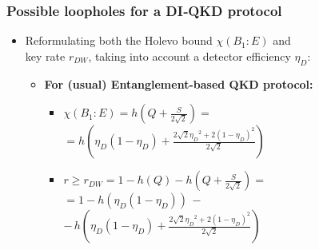 \documentclass{beamer}
\begin{document}
		\begin{frame}
			\frametitle{\Large Possible loopholes for a DI‑QKD protocol}

            \vspace{3.5ex}
            \begin{itemize}
                \item Reformulating both the Holevo bound $\chi({B}_{1}:E)$ and\\ key rate ${r}_{DW}$, taking into account a detector efficiency ${\eta}_{D}$:
                \begin{itemize}
                    \item \textbf{For (usual) Entanglement-based QKD protocol:}
                    \begin{itemize}
                        \item $\chi({B}_{1}:E) = h\left( Q + \frac{S}{2 \sqrt{2}} \right) = $\\
                        \vspace{0.5ex}
                        \hspace{8ex}
                        $ = h\left( {\eta}_{D} (1 - {\eta}_{D}) + \frac{2 \sqrt{2} {{\eta}_{D}}^{2} + 2 {(1 - {\eta}_{D})}^{2}}{2 \sqrt{2}} \right)$
                        \item $r \geq {r}_{DW} = 1 - h(Q) - h\left( Q + \frac{S}{2 \sqrt{2}} \right) = $\\
                        \vspace{0.25ex}
                        \hspace{6.8ex}$= 1 - h({\eta}_{D} (1 - {\eta}_{D}))\, - $\\
                        \vspace{0.25ex}
                        \hspace{10ex}
                        $ -\, h\left( {\eta}_{D} (1 - {\eta}_{D}) + \frac{2 \sqrt{2} {{\eta}_{D}}^{2} + 2 {(1 - {\eta}_{D})}^{2}}{2 \sqrt{2}} \right)$\\
                    \end{itemize}
                \end{itemize}
            \end{itemize}
		\end{frame}
\end{document}
